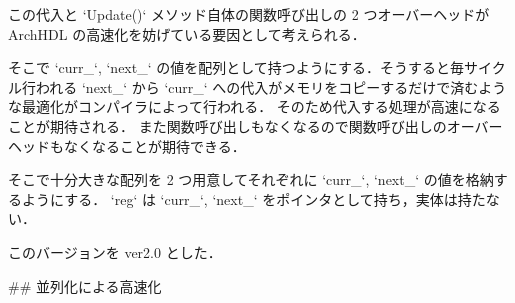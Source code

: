 この代入と `Update()` メソッド自体の関数呼び出しの
2 つオーバーヘッドが ArchHDL の高速化を妨げている要因として考えられる．

そこで `curr_`, `next_`
の値を配列として持つようにする．そうすると毎サイクル行われる `next_` から `curr_`
への代入がメモリをコピーするだけで済むような最適化がコンパイラによって行われる．
そのため代入する処理が高速になることが期待される．
また関数呼び出しもなくなるので関数呼び出しのオーバーヘッドもなくなることが期待できる．

そこで十分大きな配列を 2 つ用意してそれぞれに `curr_`, `next_` の値を格納するようにする．
`reg` は `curr_`, `next_` をポインタとして持ち，実体は持たない．

このバージョンを ver2.0 とした．




## 並列化による高速化









